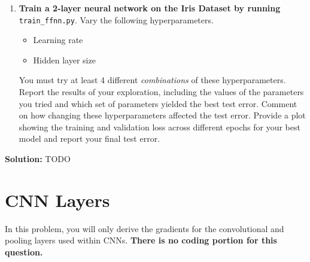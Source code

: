 \documentclass{article}
\newcommand{\Question}[1]{\Large \section{ #1 } \normalsize}
\newenvironment{solution}{\color{blue} \smallskip \textbf{Solution:}}{}
\begin{document}
\begin{enumerate}
    \item 
    \textbf{Train a 2-layer neural network on the Iris Dataset by running} \texttt{train\_ffnn.py}. 
    Vary the following hyperparameters.
    \begin{itemize}
        \item Learning rate
        \item Hidden layer size
    \end{itemize}
    You must try at least 4 different \textit{combinations} of these hyperparameters. 
    Report the results of your exploration, including the values of the parameters you tried and which set of parameters yielded the best test error. 
    Comment on how changing these hyperparameters affected the test error. 
    Provide a plot showing the training and validation loss across different epochs for your best model and report your final test error.
\end{enumerate}

\begin{solution}
    TODO
\end{solution}

\newpage
\Question{CNN Layers}
In this problem, you will only derive the gradients for the convolutional and pooling layers used within CNNs. 
\textbf{There is no coding portion for this question.}
\end{document}
